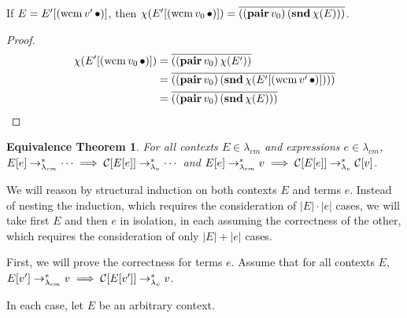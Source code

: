 \begin{lemma}
\label{wcm-collapse}
If $E=E'[(\mathrm{wcm}\,v'\,\bullet)]$, then $\chi(E'[(\mathrm{wcm}\,v_0\,\bullet)])=\overline{((\mathbf{pair}\,v_0)\,(\mathbf{snd}\,\chi(E)))}$.
\end{lemma}

\begin{proof}
\begin{align*}
\chi(E'[(\mathrm{wcm}\,v_0\,\bullet)]) &= \overline{((\mathbf{pair}\,v_0)\,\chi(E'))}\\
                           &= \overline{((\mathbf{pair}\,v_0)\,(\mathbf{snd}\,\chi(E'[(\mathrm{wcm}\,v'\,\bullet)])))}\\
                           &= \overline{((\mathbf{pair}\,v_0)\,(\mathbf{snd}\,\chi(E)))}\\
\end{align*}
\end{proof}

\newtheorem*{eqtheoreme}{Equivalence Theorem}
\begin{eqtheoreme}
For all contexts $E\in\lambda_{cm}$ and expressions $e\in\lambda_{cm}$, $E[e]\rightarrow_{\lambda_{cm}}^{*}\cdots\implies\mathcal{C}[E[e]]\rightarrow_{\lambda_v}^{*}\cdots$ and $E[e]\rightarrow_{\lambda_{cm}}^{*} v\implies\mathcal{C}[E[e]]\rightarrow_{\lambda_v}^{*} \mathcal{C}[v]$.
\end{eqtheoreme}

We will reason by structural induction on both contexts $E$ and terms $e$. Instead of
nesting the induction, which requires the consideration of $|E|\cdot|e|$ cases, we will
take first $E$ and then $e$ in isolation, in each assuming the correctness of the other,
which requires the consideration of only $|E|+|e|$ cases.

First, we will prove the correctness for terms $e$. Assume that for all contexts $E$,
$E[v']\rightarrow_{\lambda_{cm}}^{*} v\implies\mathcal{C}[E[v']]\rightarrow_{\lambda_v}^{*} v$.

In each case, let $E$ be an arbitrary context.

